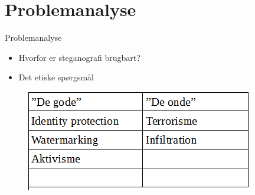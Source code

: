 \section{Problemanalyse}
\begin{frame}{Problemanalyse}{}
	\begin{itemize}
		\item Hvorfor er steganografi brugbart?
		\item Det etiske spørgsmål
	\end{itemize}
	\begin{figure}[!H]
			\centering
			\includegraphics[width=.55\textwidth]{./Tessa/tabel.png}
	\end{figure}
\end{frame}


